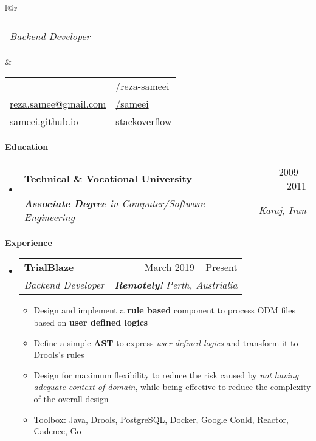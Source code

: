 \documentclass[letterpaper,12pt]{article}[leftmargin=*]
\makeatletter
\def \fullname {Reza Same'ei}
\def \subtitle {Backend Developer}
\def \linkedinicon {\faLinkedin}
\def \linkedinlink {http://linkedin.com/in/reza-sameei/}
\def \linkedintext {/reza-sameei}
\def \phoneicon {\faPhone}
\def \phonetext {+98-912-666-2695}
\def \emailicon {\faEnvelope}
\def \emaillink {mailto:reza.samee@gmail.com}
\def \emailtext {reza.samee@gmail.com}
\def \githubicon {\faGithub}
\def \githublink {https://github.com/sameei}
\def \githubtext {/sameei}
\def \stacksiteicon {\faGlobe}
\def \stacksitelink {https://stackoverflow.com/users/998642/reza-sameei}
\def \stacksitetext {stackoverflow}
\def \websiteicon {\faGlobe}
\def \websitelink {https://sameei.github.io/}
\def \websitetext {sameei.github.io}
\def \headertype {\doublecol} %
\def \entryspacing {-0pt}
\def \linkedin {\linkedinicon \hspace{3pt}\href{\linkedinlink}{\linkedintext}}
\def \phone {\phoneicon \hspace{3pt}{ \phonetext}}
\def \email {\emailicon \hspace{3pt}\href{\emaillink}{\emailtext}}
\def \github {\githubicon \hspace{3pt}\href{\githublink}{\githubtext}}
\def \stackoverflow {\stacksiteicon \hspace{3pt}\href{\stacksitelink}{\stacksitetext}}
\def \website {\websiteicon \hspace{3pt}\href{\websitelink}{\websitetext}}
\renewcommand{\section}[2]{\vspace{5pt}
  \colorbox{secondary}{\color{white}\raggedbottom\normalsize\textbf{{#1}{\hspace{7pt}#2}}}
}
\newcommand{\resumeEntryStart}{\begin{itemize}[leftmargin=2.5mm]}
\newcommand{\resumeEntryEnd}{\end{itemize}\vspace{\entryspacing}}
\newcommand{\resumeItemListStart}{\begin{itemize}[leftmargin=4.5mm]}
\newcommand{\resumeItemListEnd}{\end{itemize}}
\newcommand{\resumeItem}[1]{
  \item\small{
    {#1 \vspace{-2pt}}
  }
}
\newcommand{\resumeEntryTSDL}[4]{
  \vspace{-1pt}\item[]
    \begin{tabular*}{0.97\textwidth}{l@{\extracolsep{\fill}}r}
      \textbf{\color{primary}#1} & {\firabook\color{accent}\small#2} \\
      \textit{\color{accent}\small#3} & \textit{\color{accent}\small#4} \\
    \end{tabular*}\vspace{-6pt}
}
\newcommand{\resumeEntryS}[2]{
  \item[]\small{
    \textbf{\color{primary}#1 }{ #2 \vspace{-6pt}}
  }
}
\newcommand{\doublecol}[6]{
  \begin{tabular*}{\textwidth}{l@{\extracolsep{\fill}}r}
    {
      \begin{tabular}[c]{l}
        \fontsize{35}{45}\selectfont{\color{primary}{{\textbf{\fullname}}}}
		\\
        {\textit{\subtitle}} %
      \end{tabular}
    } & {
      \begin{tabular}[c]{l@{\hspace{1.5em}}l}
        {\small#4} & {\small#1} \\
        {\small#5} & {\small#2} \\
        {\small#6} & {\small#3}
      \end{tabular}
    }
  \end{tabular*}
}
\newcommand{\singlecol}[6]{
  \begin{tabular*}{\textwidth}{l@{\extracolsep{\fill}}r}
    {
      \begin{tabular}[b]{l}
        \fontsize{35}{45}\selectfont{\color{primary}{{\textbf{\fullname}}}} \\
        {\textit{\subtitle}} %
      \end{tabular}
    } & {
      \begin{tabular}[c]{l}
        {\small#1} \\
        {\small#2} \\
        {\small#3} \\
        {\small#4} \\
        {\small#5} \\
        {\small#6}
      \end{tabular}
    }
  \end{tabular*}
}
\makeatother
\begin{document}


\headertype{\linkedin}{\github}{\stackoverflow}{\phone}{\email}{\website}{} %




\section{\faGraduationCap}{Education}

  \resumeEntryStart
    \resumeEntryTSDL
      {Technical \& Vocational University}{2009 -- 2011}
      {\textbf{Associate Degree} in Computer/Software Engineering}{Karaj, Iran}
  \resumeEntryEnd

\section{\faPieChart}{Experience}

  \resumeEntryStart
    \resumeEntryTSDL
      {\href{https://trialblaze.com}{TrialBlaze}}{March 2019 -- Present}
      {Backend Developer}{\textbf{Remotely}! Perth, Austrialia}
    \resumeItemListStart
	  \resumeItem { Design and implement a \textbf{rule based} component to process ODM files based on \textbf{user defined logics}}
      \resumeItem{Define a simple \textbf{AST} to express \textit{user defined logics} and transform it to Drools's rules}
      \resumeItem{Design for maximum flexibility to reduce the risk caused by \textit{not having adequate context of domain}, while being effective to reduce the complexity of the overall design}
      \resumeItem{Toolbox: Java, Drools, PostgreSQL, Docker, Google Could, Reactor, Cadence, Go}
    \resumeItemListEnd
  \resumeEntryEnd
\end{document}
